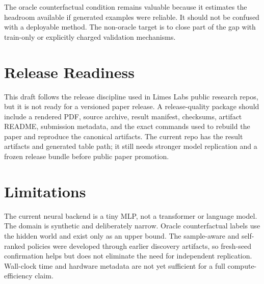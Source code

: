 \documentclass[11pt]{article}
\begin{document}
The oracle counterfactual condition remains valuable because it estimates the
headroom available if generated examples were reliable. It should not be
confused with a deployable method. The non-oracle target is to close part of
the gap with train-only or explicitly charged validation mechanisms.

\section{Release Readiness}

This draft follows the release discipline used in Limes Labs public research
repos, but it is not ready for a versioned paper release. A release-quality
package should include a rendered PDF, source archive, result manifest,
checksums, artifact README, submission metadata, and the exact commands used to
rebuild the paper and reproduce the canonical artifacts. The current repo has
the result artifacts and generated table path; it still needs stronger model
replication and a frozen release bundle before public paper promotion.

\section{Limitations}

The current neural backend is a tiny MLP, not a transformer or language model.
The domain is synthetic and deliberately narrow. Oracle counterfactual labels
use the hidden world and exist only as an upper bound. The sample-aware and
self-ranked policies were developed through earlier discovery artifacts, so
fresh-seed confirmation helps but does not eliminate the need for independent
replication. Wall-clock time and hardware metadata are not yet sufficient for
a full compute-efficiency claim.



\end{document}
